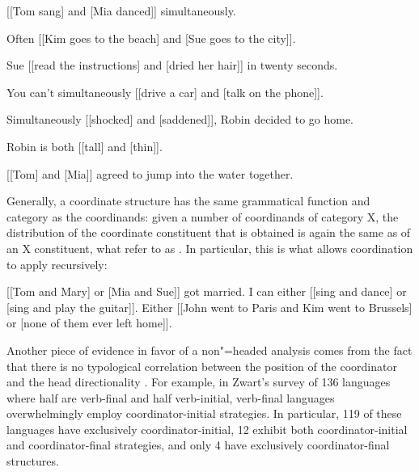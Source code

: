\eal
\label{c0}
\ex{} [[Tom sang] and [Mia danced]] simultaneously.

\ex{} Often [[Kim goes to the beach] and [Sue goes to the city]].

\ex{} Sue [[read the instructions] and [dried her hair]] in twenty seconds.

\ex{} You can't simultaneously [[drive a car] and [talk on the phone]].

\ex{} Simultaneously [[shocked] and [saddened]], Robin decided to go home.

\ex Robin is both [[tall] and [thin]].

\ex{} [[Tom] and [Mia]] agreed to jump into the water together.
\zl


Generally, a coordinate structure has the same grammatical function and category as the coordinands:
given a number of coordinands of category X, the distribution of the coordinate constituent that is
obtained is again the same as of an X constituent, what \citet[]{pullumzwicky} refer to as .
In particular, this is what allows coordination to apply recursively:

\eal
\ex {}[[Tom and Mary] or [Mia and Sue]] got married.
\ex I can either [[sing and dance] or [sing and play the guitar]].
\ex Either [[John went to Paris and Kim went to Brussels] or [none of them ever left home]].
\zl

Another piece of evidence in favor of a non"=headed analysis comes from the fact that there is no typological correlation between the position of the coordinator and the head directionality \citep{zwart}.
For example, in Zwart's  survey of 136 languages where half are verb-final and half
verb-initial,  verb-final languages overwhelmingly employ coordinator-initial strategies.
In particular, 119 of these languages have exclusively coordinator-initial, 12 exhibit both coordinator-initial
and coordinator-final strategies, and only 4 have exclusively coordinator-final structures. 


